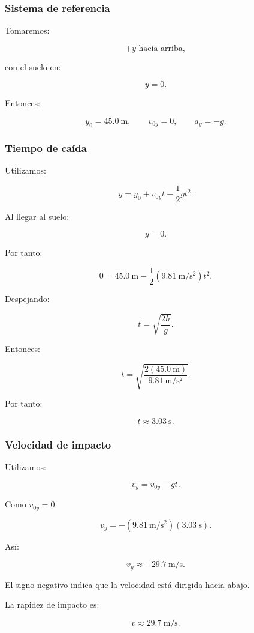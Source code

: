 \subsubsection*{Sistema de referencia}

Tomaremos:

\[
+y\text{ hacia arriba},
\]

con el suelo en:

\[ y=0. \]

Entonces:

\[
y_0=\SI{45.0}{\meter},
\qquad
v_{0y}=0,
\qquad
a_y=-g.
\]


\subsubsection*{Tiempo de caída}

Utilizamos:

\[ y=y_0+v_{0y}t-\frac{1}{2}gt^2. \]

Al llegar al suelo:

\[ y=0. \]

Por tanto:

\[
0
=
\SI{45.0}{\meter}
-
\frac{1}{2}
(\SI{9.81}{\meter\per\second\squared})t^2.
\]

Despejando:

\[ t=\sqrt{\frac{2h}{g}}. \]

Entonces:

\[
t
=
\sqrt{
\frac{2(\SI{45.0}{\meter})}
{\SI{9.81}{\meter\per\second\squared}}
}.
\]

Por tanto:

\[ \boxed{t\approx\SI{3.03}{\second}}. \]


\subsubsection*{Velocidad de impacto}

Utilizamos:

\[ v_y=v_{0y}-gt. \]

Como \(v_{0y}=0\):

\[
v_y
=
-(\SI{9.81}{\meter\per\second\squared})
(\SI{3.03}{\second}).
\]

Así:

\[ \boxed{v_y\approx-\SI{29.7}{\meter\per\second}}. \]

El signo negativo indica que la velocidad está dirigida hacia abajo.

La rapidez de impacto es:

\[ \boxed{v\approx\SI{29.7}{\meter\per\second}}. \]

